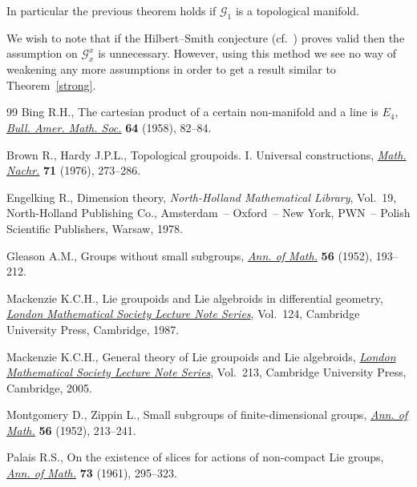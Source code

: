 \documentclass[11pt]{article}
\begin{document}
\begin{rem} In particular the previous theorem holds if $\mathcal{G}_1$ is a topological manifold.
\end{rem}
\begin{rem} We wish to note that if the Hilbert--Smith conjecture (cf.~\cite{TT}) proves valid then the assumption on $\mathcal{G}_x^x$ is unnecessary. However, using this method we see no way of weakening any more assumptions in order to get a result similar to Theorem~\ref{strong}.
\end{rem}
\begin{thebibliography}{99}
Bing R.H., The cartesian product of a certain non-manifold and a line is
 {$E_{4}$}, \href{https://doi.org/10.1090/S0002-9904-1958-10160-3}{\textit{Bull. Amer. Math. Soc.}} \textbf{64} (1958), 82--84.

Brown R., Hardy J.P.L., Topological groupoids. {I}. {U}niversal constructions,
 \href{https://doi.org/10.1002/mana.19760710123}{\textit{Math. Nachr.}} \textbf{71} (1976), 273--286.

Engelking R., Dimension theory, \textit{North-Holland Mathematical Library},
 Vol.~19, North-Holland Publishing Co., Amsterdam~-- Oxford~-- New York,
 PWN~-- Polish Scientific Publishers, Warsaw, 1978.

Gleason A.M., Groups without small subgroups, \href{https://doi.org/10.2307/1969795}{\textit{Ann. of Math.}}
 \textbf{56} (1952), 193--212.

Mackenzie K.C.H., Lie groupoids and {L}ie algebroids in differential geometry,
 \href{https://doi.org/10.1017/CBO9780511661839}{\textit{London Mathematical Society Lecture Note Series}}, Vol.~124, Cambridge
 University Press, Cambridge, 1987.

Mackenzie K.C.H., General theory of {L}ie groupoids and {L}ie algebroids,
 \href{https://doi.org/10.1017/CBO9781107325883}{\textit{London Mathematical Society Lecture Note Series}}, Vol.~213, Cambridge
 University Press, Cambridge, 2005.

Montgomery D., Zippin L., Small subgroups of finite-dimensional groups,
 \href{https://doi.org/10.2307/1969796}{\textit{Ann. of Math.}} \textbf{56} (1952), 213--241.

Palais R.S., On the existence of slices for actions of non-compact {L}ie
 groups, \href{https://doi.org/10.2307/1970335}{\textit{Ann. of Math.}} \textbf{73} (1961), 295--323.


\end{thebibliography}
\end{document}
